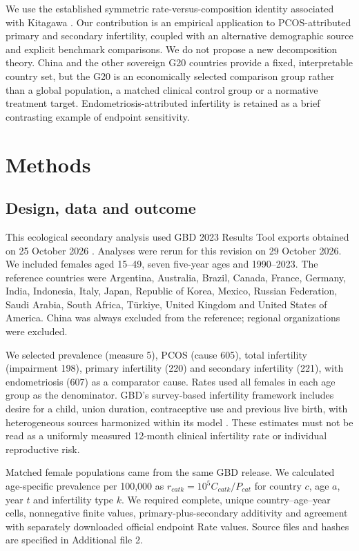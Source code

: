 \documentclass[11pt,a4paper]{article}
\begin{document}
We use the established symmetric rate-versus-composition identity associated with Kitagawa \cite{kitagawa}. Our contribution is an empirical application to PCOS-attributed primary and secondary infertility, coupled with an alternative demographic source and explicit benchmark comparisons. We do not propose a new decomposition theory. China and the other sovereign G20 countries provide a fixed, interpretable country set, but the G20 is an economically selected comparison group rather than a global population, a matched clinical control group or a normative treatment target. Endometriosis-attributed infertility is retained as a brief contrasting example of endpoint sensitivity.

\section{Methods}
\subsection{Design, data and outcome}
This ecological secondary analysis used GBD 2023 Results Tool exports obtained on 25 October 2026 \cite{results}. Analyses were rerun for this revision on 29 October 2026. We included females aged 15--49, seven five-year ages and 1990--2023. The reference countries were Argentina, Australia, Brazil, Canada, France, Germany, India, Indonesia, Italy, Japan, Republic of Korea, Mexico, Russian Federation, Saudi Arabia, South Africa, T\"urkiye, United Kingdom and United States of America. China was always excluded from the reference; regional organizations were excluded.

We selected prevalence (measure 5), PCOS (cause 605), total infertility (impairment 198), primary infertility (220) and secondary infertility (221), with endometriosis (607) as a comparator cause. Rates used all females in each age group as the denominator. GBD's survey-based infertility framework includes desire for a child, union duration, contraceptive use and previous live birth, with heterogeneous sources harmonized within its model \cite{gbd}. These estimates must not be read as a uniformly measured 12-month clinical infertility rate or individual reproductive risk.

Matched female populations came from the same GBD release. We calculated age-specific prevalence per 100,000 as $r_{catk}=10^5 C_{catk}/P_{cat}$ for country $c$, age $a$, year $t$ and infertility type $k$. We required complete, unique country--age--year cells, nonnegative finite values, primary-plus-secondary additivity and agreement with separately downloaded official endpoint Rate values. Source files and hashes are specified in Additional file 2.
\end{document}
